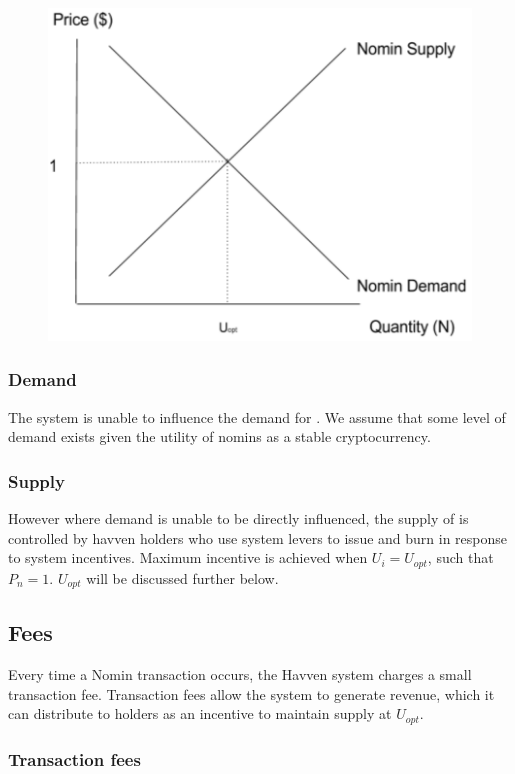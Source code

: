 \begin{figure}[h!]
    \centering
    \includegraphics[width=.7\textwidth]{img/nomin-demand-vs-supply}
\end{figure}

\subsubsection*{Demand}

\noindent The system is unable to influence the demand for \NOM{}. We assume that some level of demand exists given the utility of nomins as a stable cryptocurrency.

\subsubsection*{Supply}

\noindent However where demand is unable to be directly influenced, the supply of \NOM{} is controlled by havven holders who use system levers to issue and burn \NOM{} in response to system incentives. Maximum incentive is achieved when $U_i = U_{opt}$, such that $P_n = 1$. $U_{opt}$ will be discussed further below. \\

\subsection{Fees} Every time a Nomin transaction occurs, the Havven system charges a small transaction fee. Transaction fees allow the system to generate revenue, which it can distribute to \HAV{} holders as an incentive to maintain \NOM{} supply at $U_{opt}$. \\

\subsubsection{Transaction fees}

